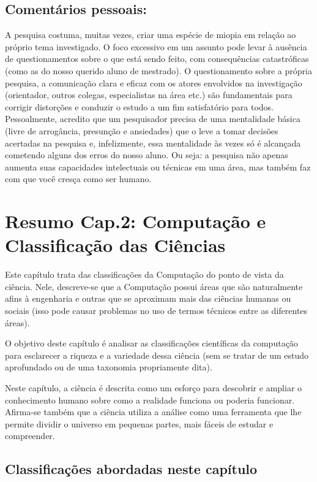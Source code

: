 \documentclass[12pt,a4paper]{article}
\begin{document}
\begin{enumerate}
    \subsection{Comentários pessoais:}
     A pesquisa costuma, muitas vezes, criar uma espécie de miopia em relação ao próprio tema investigado. 
    O foco excessivo em um assunto pode levar à ausência de questionamentos sobre o que está sendo feito, com consequências catastróficas 
    (como as do nosso querido aluno de mestrado). O questionamento sobre a própria pesquisa, a comunicação clara e eficaz com os atores envolvidos na investigação 
    (orientador, outros colegas, especialistas na área etc.) são fundamentais para corrigir distorções e conduzir o estudo a um fim satisfatório para todos.\\
     Pessoalmente, acredito que um pesquisador precisa de uma mentalidade básica (livre de arrogância, presunção e ansiedades) que o leve a tomar decisões acertadas na pesquisa e, infelizmente, essa mentalidade às vezes só é alcançada cometendo alguns dos erros do nosso aluno. 
     Ou seja: a pesquisa não apenas aumenta suas capacidades intelectuais ou técnicas em uma área, mas também faz com que você cresça como ser humano.
\end{enumerate}

\section{Resumo Cap.2: Computação e Classificação das Ciências}
Este capítulo trata das classificações da Computação do ponto de vista da ciência. Nele, descreve-se que a Computação possui áreas que são naturalmente afins à engenharia e outras que se aproximam mais das ciências humanas ou sociais (isso pode causar problemas no uso de termos técnicos entre as diferentes áreas).

O objetivo deste capítulo é analisar as classificações científicas da computação para esclarecer a riqueza e a variedade dessa ciência (sem se tratar de um estudo aprofundado ou de uma taxonomia propriamente dita).

Neste capítulo, a ciência é descrita como um esforço para descobrir e ampliar o conhecimento humano sobre como a realidade funciona ou poderia funcionar. Afirma-se também que a ciência utiliza a análise como uma ferramenta que lhe permite dividir o universo em pequenas partes, mais fáceis de estudar e compreender.

\subsection{Classificações abordadas neste capítulo}
\end{document}
